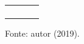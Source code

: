 \begin{table}[]
\begin{tabular*}{\columnwidth}{@{\extracolsep{\fill}}lccl}
                                                                                    &                                                                       &                                            &                                                                                                                                                                                                                                  \\
                                                                                    &                                                                       &                                            &                                                                                                                                                                                                                                  \\
                                                                                    &                                                                       &                                            &                                                                                                                                                                                                                                  \\
                                                                                    &                                                                       &                                            &                                                                                                                                                                                                                                  \\ \hline
    \end{tabular*}
    \begin{flushleft}
        \par \small Fonte: autor (2019).\vspace{-0.6cm}
    \end{flushleft}
    \end{table}

